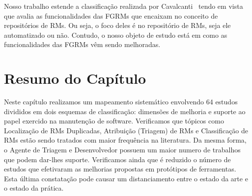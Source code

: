 Nosso trabalho estende a classificação realizada por
Cavalcanti~\cite{cavalcanti2014challenges} tendo em vista que avalia as
funcionalidades das FGRMs que encaixam no conceito de repositórios de RMs. Ou
seja, o foco deles é no repositório de RMs, seja ele automatizado ou não.
Contudo, o nosso objeto de estudo está em como as funcionalidades das FGRMs vêm
sendo melhoradas.

\section{Resumo do Capítulo}
\label{sec:resumo_capitulo}

Neste capítulo realizamos um mapeamento sistemático envolvendo 64 estudos
divididos em dois esquemas de classificação: dimensões de melhoria e suporte ao
papel exercido na manutenção de software. Verificamos que tópicos como
Localização de RMs Duplicadas, Atribuição (Triagem) de RMs e Classificação de
RMs estão sendo tratados com maior frequência na literatura. Da mesma forma, o
Agente de Triagem e Desenvolvedor possuem um maior numero de trabalhos que podem
dar-lhes suporte. Verificamos ainda que é reduzido o número de estudos que
efetivaram as melhorias propostas em protótipos de ferramentas. Esta última
constatação pode causar um distanciamento entre o estado da arte e o estado da
prática.